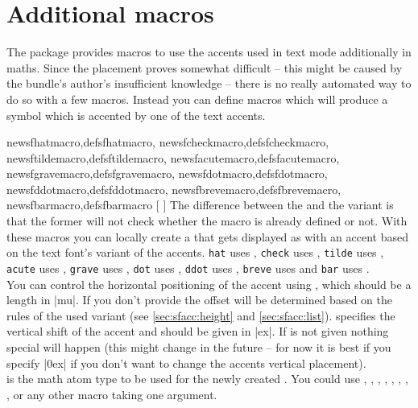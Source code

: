 \section{Additional macros}
The package provides macros to use the accents used in text mode additionally in
maths. Since the placement proves somewhat difficult -- this might be caused by
the bundle's author's insufficient knowledge -- there is no really automated way
to do so with a few macros. Instead you can define macros which will produce a
symbol which is accented by one of the text accents.

\begin{describemacro}%
  {%
    newsfhatmacro,defsfhatmacro,%
    newsfcheckmacro,defsfcheckmacro,%
    newsftildemacro,defsftildemacro,%
    newsfacutemacro,defsfacutemacro,%
    newsfgravemacro,defsfgravemacro,%
    newsfdotmacro,defsfdotmacro,%
    newsfddotmacro,defsfddotmacro,%
    newsfbrevemacro,defsfbrevemacro,%
    newsfbarmacro,defsfbarmacro%
  }%
  [%
    \hspace{0pt}%
  ]
  The difference between the  and the  variant is that
  the former will not check whether the macro  is already defined or
  not. With these macros you can locally create a  that gets displayed
  as  with an accent based on the text font's variant of the
  accents.  \texttt{hat} uses \cs{^}, \texttt{check} uses , \texttt{tilde}
  uses \cs{~}, \texttt{acute} uses , \texttt{grave} uses ,
  \texttt{dot} uses , \texttt{ddot} uses , \texttt{breve} uses
   and \texttt{bar} uses \cs{=}.\\
  You can control the horizontal positioning of the accent using
  , which should be a length in |mu|. If you don't provide
   the offset will be determined based on the rules of the used
  variant (see \autoref{sec:sfacc:height} and \autoref{sec:sfacc:list}).
   specifies the vertical shift of the accent and should be given
  in |ex|. If  is not given nothing special will happen (this
  might change in the future -- for now it is best if you specify |0ex| if you
  don't want to change the accents vertical placement).\\
   is the math atom type to be used for the newly created .
  You could use , , , ,
  , , , , or any other
  macro taking one argument.
\end{describemacro}%

